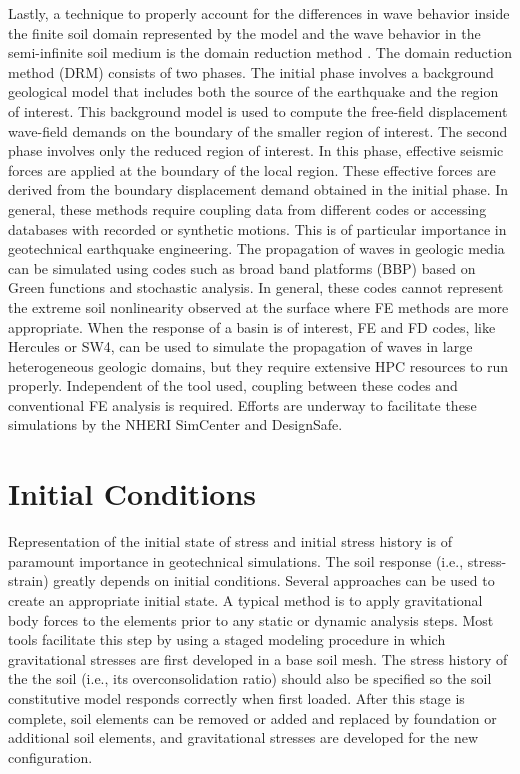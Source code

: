 Lastly, a technique to properly account for the differences in wave behavior inside the finite soil domain represented by the model and the wave behavior in the semi-infinite soil medium is the domain reduction method \citep{Bielak03, Yoshimura03}. The domain reduction method (DRM) consists of two phases. The initial phase involves a background geological model that includes both the source of the earthquake and the region of interest. This background model is used to compute the free-field displacement wave-field demands on the boundary of the smaller region of interest. The second phase involves only the reduced region of interest. In this phase, effective seismic forces are applied at the boundary of the local region. These effective forces are derived from the boundary displacement demand obtained in the initial phase. In general, these methods require coupling data from different codes or accessing databases with recorded or synthetic motions. This is of particular importance in geotechnical earthquake engineering. The propagation of waves in geologic media can be simulated using codes such as broad band platforms (BBP) based on Green functions and stochastic analysis. In general, these codes cannot represent the extreme soil nonlinearity observed at the surface where FE methods are more appropriate. When the response of a basin is of interest, FE and FD codes, like Hercules or SW4, can be used to simulate the propagation of waves in large heterogeneous geologic domains, but they require extensive HPC resources to run properly. Independent of the tool used, coupling between these codes and conventional FE analysis is required. Efforts are underway to facilitate these simulations by the NHERI SimCenter and DesignSafe.

\section{Initial Conditions}
\label{sec:resp_geotech_6}

Representation of the initial state of stress and initial stress history is of paramount importance in geotechnical simulations. The soil response (i.e., stress-strain) greatly depends on initial conditions. Several approaches can be used to create an appropriate initial state. A typical method is to apply gravitational body forces to the elements prior to any static or dynamic analysis steps. Most tools facilitate this step by using a staged modeling procedure in which gravitational stresses are first developed in a base soil mesh. The stress history of the the soil (i.e., its overconsolidation ratio) should also be specified so the soil constitutive model responds correctly when first loaded. After this stage is complete, soil elements can be removed or added and replaced by foundation or additional soil elements, and gravitational stresses are developed for the new configuration.

